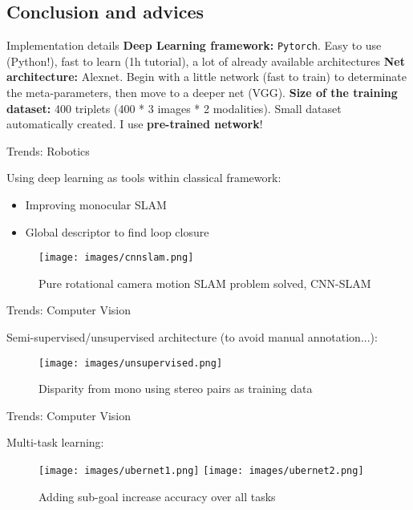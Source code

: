 \subsection{Conclusion and advices}

\label{sec:results}

\begin{frame}{Implementation details}
	\vfill	
	\textbf{Deep Learning framework:} \texttt{Pytorch}. Easy to use (Python!), fast to learn (1h tutorial), a lot of already available architectures
	\vfill
	\textbf{Net architecture:} Alexnet. Begin with a little network (fast to train) to determinate the meta-parameters, then move to a deeper net (VGG).
	\vfill
	\textbf{Size of the training dataset:} 400 triplets (400 * 3 images * 2 modalities). Small dataset automatically created. I use \textbf{pre-trained network}!
	\vfill
\end{frame}

\begin{frame}{Trends: Robotics}

	Using deep learning as tools within classical framework:
	\begin{itemize}
		\item Improving monocular SLAM
		\item Global descriptor to find loop closure
	\end{itemize}
	\begin{figure}
		\texttt{[image: images/cnnslam.png]}
		\caption{Pure rotational camera motion SLAM problem solved, CNN-SLAM~\cite{POINTNET}}
	\end{figure}
	
\end{frame}

\begin{frame}{Trends: Computer Vision}

	Semi-supervised/unsupervised architecture (to avoid manual annotation...):
	
	\begin{figure}
		\texttt{[image: images/unsupervised.png]}
		\caption{Disparity from mono using stereo pairs as training data~\cite{UNSUPERVISED}}
	\end{figure}

\end{frame}

\begin{frame}{Trends: Computer Vision}

	Multi-task learning:
	
	\begin{figure}
		\texttt{[image: images/ubernet1.png]}
		\texttt{[image: images/ubernet2.png]}
		\caption{Adding sub-goal increase accuracy over all tasks~\cite{UBERNET}}
	\end{figure}

	

\end{frame}


